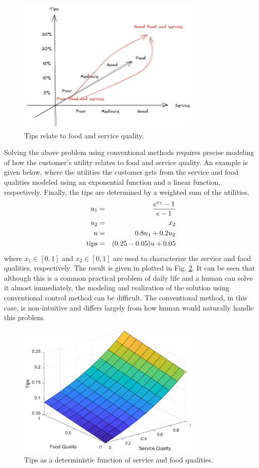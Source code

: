 \begin{figure}
	\centering
	\includegraphics[width=250pt]{chapters/ch-fuzzy-control-system/figures/expmotivating.png}
	\caption{Tips relate to food and service quality.} \label{ch:fcs:fig:expmotivating}
\end{figure}

Solving the above problem using conventional methods requires precise modeling of how the customer's utility relates to food and service quality. An example is given below, where the utilities the customer gets from the service and food qualities modeled using an exponential function and a linear function, respectively. Finally, the tips are determined by a weighted sum of the utilities.
\begin{eqnarray}
	u_1 &=& \dfrac{e^{x_1}-1}{e-1} \nonumber \\
	u_2 &=& x_2 \nonumber \\
	u &=& 0.8 u_1 + 0.2 u_2 \nonumber \\
	\textup{tips} &=& (0.25-0.05)u + 0.05 \nonumber
\end{eqnarray}
where $x_1\in [0,1]$ and $x_2 \in [0,1]$ are used to characterize the service and food qualities, respectively. The result is given in plotted in Fig. \ref{ch:fcs:fig:motivatingexp_conventional}. It can be seen that although this is a common practical problem of daily life and a human can solve it almost immediately, the modeling and realization of the solution using conventional control method can be difficult. The conventional method, in this case, is non-intuitive and differs largely from how human would naturally handle this problem.

\begin{figure}
	\centering
	\includegraphics[width=250pt]{chapters/ch-fuzzy-control-system/figures/motivatingexp_conventional.eps}
	\caption{Tips as a deterministic function of service and food qualities.} \label{ch:fcs:fig:motivatingexp_conventional}
\end{figure}

